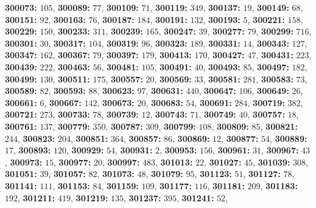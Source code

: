 \textsf{\bfseries 300073:} $105$, \textsf{\bfseries 300089:} $77$, \textsf{\bfseries 300109:} $71$, \textsf{\bfseries 300119:} $349$, \textsf{\bfseries 300137:} $19$, \textsf{\bfseries 300149:} $68$, \textsf{\bfseries 300151:} $92$, \textsf{\bfseries 300163:} $76$, \textsf{\bfseries 300187:} $184$, \textsf{\bfseries 300191:} $132$, \textsf{\bfseries 300193:} $5$, \textsf{\bfseries 300221:} $158$, \textsf{\bfseries 300229:} $150$, \textsf{\bfseries 300233:} $311$, \textsf{\bfseries 300239:} $165$, \textsf{\bfseries 300247:} $39$, \textsf{\bfseries 300277:} $79$, \textsf{\bfseries 300299:} $716$, \textsf{\bfseries 300301:} $30$, \textsf{\bfseries 300317:} $104$, \textsf{\bfseries 300319:} $96$, \textsf{\bfseries 300323:} $189$, \textsf{\bfseries 300331:} $14$, \textsf{\bfseries 300343:} $127$, \textsf{\bfseries 300347:} $162$, \textsf{\bfseries 300367:} $79$, \textsf{\bfseries 300397:} $179$, \textsf{\bfseries 300413:} $170$, \textsf{\bfseries 300427:} $47$, \textsf{\bfseries 300431:} $223$, \textsf{\bfseries 300439:} $222$, \textsf{\bfseries 300463:} $56$, \textsf{\bfseries 300481:} $105$, \textsf{\bfseries 300491:} $40$, \textsf{\bfseries 300493:} $85$, \textsf{\bfseries 300497:} $182$, \textsf{\bfseries 300499:} $130$, \textsf{\bfseries 300511:} $175$, \textsf{\bfseries 300557:} $20$, \textsf{\bfseries 300569:} $33$, \textsf{\bfseries 300581:} $281$, \textsf{\bfseries 300583:} $73$, \textsf{\bfseries 300589:} $82$, \textsf{\bfseries 300593:} $88$, \textsf{\bfseries 300623:} $97$, \textsf{\bfseries 300631:} $440$, \textsf{\bfseries 300647:} $106$, \textsf{\bfseries 300649:} $26$, \textsf{\bfseries 300661:} $6$, \textsf{\bfseries 300667:} $142$, \textsf{\bfseries 300673:} $20$, \textsf{\bfseries 300683:} $54$, \textsf{\bfseries 300691:} $284$, \textsf{\bfseries 300719:} $382$, \textsf{\bfseries 300721:} $273$, \textsf{\bfseries 300733:} $78$, \textsf{\bfseries 300739:} $12$, \textsf{\bfseries 300743:} $71$, \textsf{\bfseries 300749:} $40$, \textsf{\bfseries 300757:} $18$, \textsf{\bfseries 300761:} $137$, \textsf{\bfseries 300779:} $350$, \textsf{\bfseries 300787:} $309$, \textsf{\bfseries 300799:} $108$, \textsf{\bfseries 300809:} $85$, \textsf{\bfseries 300821:} $244$, \textsf{\bfseries 300823:} $204$, \textsf{\bfseries 300851:} $364$, \textsf{\bfseries 300857:} $86$, \textsf{\bfseries 300869:} $12$, \textsf{\bfseries 300877:} $54$, \textsf{\bfseries 300889:} $17$, \textsf{\bfseries 300893:} $120$, \textsf{\bfseries 300929:} $54$, \textsf{\bfseries 300931:} $2$, \textsf{\bfseries 300953:} $156$, \textsf{\bfseries 300961:} $31$, \textsf{\bfseries 300967:} $43$, \textsf{\bfseries 300973:} $15$, \textsf{\bfseries 300977:} $20$, \textsf{\bfseries 300997:} $483$, \textsf{\bfseries 301013:} $22$, \textsf{\bfseries 301027:} $45$, \textsf{\bfseries 301039:} $308$, \textsf{\bfseries 301051:} $39$, \textsf{\bfseries 301057:} $82$, \textsf{\bfseries 301073:} $48$, \textsf{\bfseries 301079:} $95$, \textsf{\bfseries 301123:} $51$, \textsf{\bfseries 301127:} $78$, \textsf{\bfseries 301141:} $111$, \textsf{\bfseries 301153:} $84$, \textsf{\bfseries 301159:} $109$, \textsf{\bfseries 301177:} $116$, \textsf{\bfseries 301181:} $209$, \textsf{\bfseries 301183:} $192$, \textsf{\bfseries 301211:} $419$, \textsf{\bfseries 301219:} $135$, \textsf{\bfseries 301237:} $395$, \textsf{\bfseries 301241:} $52$, 

